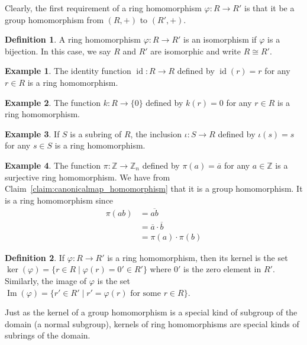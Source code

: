 \documentclass[12pt,letterpaper,DIV=11,final]{scrartcl}
\theoremstyle{plain}
\theoremstyle{definition}
\newtheorem{definition}{Definition}[section]
\newtheorem{example}{Example}[section]
\theoremstyle{remark}
\DeclareMathOperator{\id}{id}
\DeclareMathOperator{\ima}{Im}
\begin{document}
Clearly, the first requirement of a ring homomorphism $\varphi : R \to R'$ is that it be a group homomorphism from $(R, +)$ to $(R', +)$.

\begin{definition}
  A ring homomorphism $\varphi : R \to R'$ is an isomorphism if $\varphi$ is a bijection.
  In this case, we say $R$ and $R'$ are isomorphic and write $R \cong R'$.
\end{definition}

\begin{example}
  The identity function $\id : R \to R$ defined by $\id(r) = r$ for any $r \in R$ is a ring homomorphism.
\end{example}

\begin{example}
  The function $k : R \to \{ 0 \}$ defined by $k(r) = 0$ for any $r \in R$ is a ring homomorphism.
\end{example}

\begin{example}
  If $S$ is a subring of $R$, the inclusion $\iota : S \to R$ defined by $\iota(s) = s$ for any $s \in S$ is a ring homomorphism.
\end{example}

\begin{example}
  The function $\pi : \mathbb{Z} \to \mathbb{Z}_n$ defined by $\pi(a) = \overline{a}$ for any $a \in \mathbb{Z}$ is a surjective ring homomorphism.
  We have from Claim~\ref{claim:canonicalmap_homomorphism} that it is a group homomorphism.
  It is a ring homomorphism since
  \begin{align*}
    \pi(ab) &= \overline{ab} \\
            &= \overline{a} \cdot \overline{b} \\
            &= \pi(a) \cdot \pi(b)
  \end{align*}
\end{example}

\begin{definition}
  If $\varphi : R \to R'$ is a ring homomorphism, then its kernel is the set $\ker(\varphi) = \{ r \in R \mid \varphi(r) = 0' \in R' \}$ where $0'$ is the zero element in $R'$.
  Similarly, the image of $\varphi$ is the set $\ima(\varphi) = \{ r' \in R' \mid r' = \varphi(r) \text{ for some } r \in R \}$.
\end{definition}

Just as the kernel of a group homomorphism is a special kind of subgroup of the domain (a normal subgroup), kernels of ring homomorphisms are special kinds of subrings of the domain.
\end{document}

